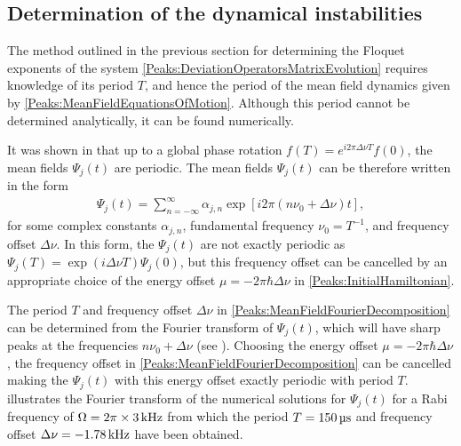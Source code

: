 \subsection{Determination of the dynamical instabilities}
\label{Peaks:ExperimentEigenvalues}

The method outlined in the previous section for determining the Floquet exponents of the system \eqref{Peaks:DeviationOperatorsMatrixEvolution} requires knowledge of its period $T$, and hence the period of the mean field dynamics given by \eqref{Peaks:MeanFieldEquationsOfMotion}. Although this period cannot be determined analytically, it can be found numerically.

It was shown in  that up to a global phase rotation $\displaystyle f(T) = e^{i 2\pi \Delta \nu T}f(0)$, the mean fields $\Psi_j(t)$ are periodic. The mean fields $\Psi_j(t)$ can be therefore written in the form
\begin{align}
    \label{Peaks:MeanFieldFourierDecomposition}
    \Psi_j(t) = \sum_{n=-\infty}^\infty \alpha_{j,n} \exp\left[i 2\pi \left( n \nu_0 + \Delta\nu\right)t \right],
\end{align}
for some complex constants $\alpha_{j, n}$, fundamental frequency $\nu_0 = T^{-1}$, and frequency offset $\Delta \nu$. In this form, the $\Psi_j(t)$ are not exactly periodic as $\Psi_j(T) = \exp(i\Delta \nu T)\Psi_j(0)$, but this frequency offset can be cancelled by an appropriate choice of the energy offset $\mu = -2 \pi \hbar\Delta \nu$ in \eqref{Peaks:InitialHamiltonian}.

The period $T$ and frequency offset $\Delta\nu$ in \eqref{Peaks:MeanFieldFourierDecomposition} can be determined from the Fourier transform of $\Psi_j(t)$, which will have sharp peaks at the frequencies $n \nu_0 + \Delta \nu$ (see ). Choosing the energy offset $\mu=-2 \pi \hbar \Delta\nu$, the frequency offset in \eqref{Peaks:MeanFieldFourierDecomposition} can be cancelled making the $\Psi_j(t)$ with this energy offset exactly periodic with period $T$.  illustrates the Fourier transform of the numerical solutions for $\Psi_j(t)$ for a Rabi frequency of $\Omega = 2 \pi \times \unit[3]{kHz}$ from which the period $T=\unit[150]{\micro{}s}$ and frequency offset $\Delta \nu = \unit[-1.78]{kHz}$ have been obtained.

